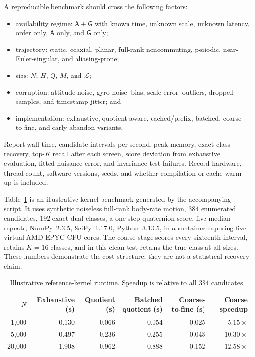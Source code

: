 \documentclass[11pt]{article}
\begin{document}
    A reproducible benchmark should cross the following factors:
    \begin{itemize}[nosep]
    \item availability regime: $\mathsf A+\mathsf G$ with known time, unknown scale,
    unknown latency, order only, $\mathsf A$ only, and $\mathsf G$ only;
    \item trajectory: static, coaxial, planar, full-rank noncommuting, periodic,
    near-Euler-singular, and aliasing-prone;
    \item size: $N$, $H$, $Q$, $M$, and $\mathcal L$;
    \item corruption: attitude noise, gyro noise, bias, scale error, outliers, dropped
    samples, and timestamp jitter; and
    \item implementation: exhaustive, quotient-aware, cached/prefix, batched,
    coarse-to-fine, and early-abandon variants.
    \end{itemize}
    Report wall time, candidate-intervals per second, peak memory, exact class recovery,
    top-$K$ recall after each screen, score deviation from exhaustive evaluation, fitted
    nuisance error, and invariance-test failures. Record hardware, thread count, software
    versions, seeds, and whether compilation or cache warm-up is included.

    Table~\ref{tab:microbenchmark} is an illustrative kernel benchmark generated by the
    accompanying script. It uses synthetic noiseless full-rank body-rate motion, $384$
    enumerated candidates, $192$ exact dual classes, a one-step quaternion score, five
    median repeats, NumPy~2.3.5, SciPy~1.17.0, Python~3.13.5, in a container exposing five virtual AMD EPYC CPU cores. The coarse stage scores every sixteenth interval, retains $K=16$ classes, and in
    this clean test retains the true class at all sizes. These numbers demonstrate the cost
    structure; they are not a statistical recovery claim.

    \begin{table}[H]
        \centering
        \small
        \caption{Illustrative reference-kernel runtime. Speedup is relative to all $384$
            candidates.}\label{tab:microbenchmark}
        \begin{tabular}{@{}rrrrrr@{}}
            \toprule
            $N$    & Exhaustive (s) & Quotient (s) & Batched quotient (s) & Coarse-to-fine (s) & Coarse speedup \\
            \midrule
            1,000  & 0.130          & 0.066        & 0.054                & 0.025              & $5.15\times$   \\
            5,000  & 0.497          & 0.236        & 0.255                & 0.048              & $10.30\times$  \\
            20,000 & 1.908          & 0.962        & 0.888                & 0.152              & $12.58\times$  \\
            \bottomrule
        \end{tabular}
    \end{table}
\end{document}
